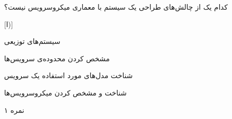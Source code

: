 

کدام یک از چالش‌های طراحی یک سیستم با معماری میکروسرویس نیست؟

[ا)]

 سیستم‌های توزیعی

 مشخص کردن محدوده‌ی سرویس‌ها

 شناخت مدل‌های مورد استفاده یک سرویس

 شناخت و مشخص کردن میکروسرویس‌ها



۱ نمره
